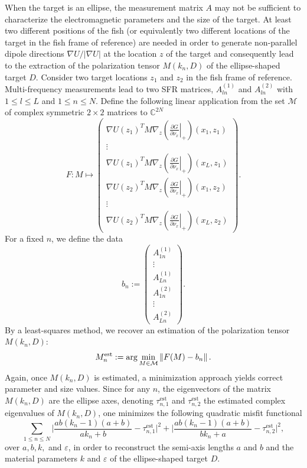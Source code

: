 \documentclass[final]{siamltex}
\numberwithin{equation}{section}
\numberwithin{figure}{section}
\numberwithin{table}{section}
\begin{document}
When the target is an ellipse, the measurement matrix $A$ may not
be sufficient to characterize the electromagnetic parameters and
the size of the target. At least two different positions of the
fish (or equivalently two different locations of the target in the
fish frame of reference) are needed in order to generate
non-parallel dipole directions $\nabla U/|\nabla U|$ at the
location $z$ of the target and consequently lead to the extraction
of the polarization tensor $M(k_n, D)$ of the ellipse-shaped
target $D$. Consider two target locations $z_{1}$ and $z_{2}$ in
the fish frame of reference. Multi-frequency measurements lead to
two SFR matrices, $A_{ln}^{(1)}$ and $A_{ln}^{(2)}$ with $1\leq
l\leq L$ and $1\leq n\leq N$. Define the following linear
application from the set $\mathcal{M}$ of complex symmetric
$2\times 2$ matrices to $\mathbb{C}^{2N}$
\[
F: M \mapsto\left(\begin{array}{c} \nabla
U(z_{1})^T  M  \nabla_{z}\left(\left.\frac{\partial G}{\partial\nu_{x}}\right|_{+}\right)(x_{1},z_{1})\\
\vdots\\
\nabla U(z_{1})^T M  \nabla_{z}\left(\left.\frac{\partial G}{\partial\nu_{x}}\right|_{+}\right)(x_{L},z_{1})\\
\nabla U(z_{2})^T M \nabla_{z}\left(\left.\frac{\partial G}{\partial\nu_{x}}\right|_{+}\right)(x_{1},z_{2})\\
\vdots\\
\nabla U(z_{2})^T M \nabla_{z}\left(\left.\frac{\partial
G}{\partial\nu_{x}}\right|_{+}\right)(x_{L},z_{2})
\end{array}\right)
.
\]
For a fixed $n$, we define the data
\[
b_{n}:=\left(\begin{array}{c}
A_{1n}^{(1)}\\
\vdots\\
A_{Ln}^{(1)}\\
A_{1n}^{(2)}\\
\vdots\\
A_{Ln}^{(2)}
\end{array}\right).
\]
By a least-squares method, we recover an estimation of the
polarization tensor $M(k_n,D)$:
\[
M_{n}^{{\rm est}}:=\arg\min_{M \in \mathcal{M}}\left\Vert F(M)
-b_{n}\right\Vert .
\]
Again, once $M(k_n,D)$ is estimated, a minimization approach
yields correct parameter and size values. Since for any $n$, the
eigenvectors of the matrix $M(k_n,D)$ are the ellipse axes,
denoting $\tau_{n,1}^{\mbox {est}}$ and $\tau_{n,2}^{\mbox {est}}$
the estimated complex eigenvalues of $M(k_n,D)$, one minimizes the
following quadratic misfit functional
$$
\sum_{1\leq n\leq N} \bigg| \frac{a b (k_n-1) (a+b)}{a k_n+b} -
\tau_{n,1}^{\mbox {est}} \bigg|^2 + \bigg| \frac{a b (k_n-1)
(a+b)}{b k_n+a} - \tau_{n,2}^{\mbox {est}} \bigg|^2,
$$
over $a, b, k,$ and  $\varepsilon$, in order to reconstruct the
semi-axis lengths $a$ and $b$ and the material parameters $k$ and
$\varepsilon$ of the ellipse-shaped target $D$.
\end{document}
